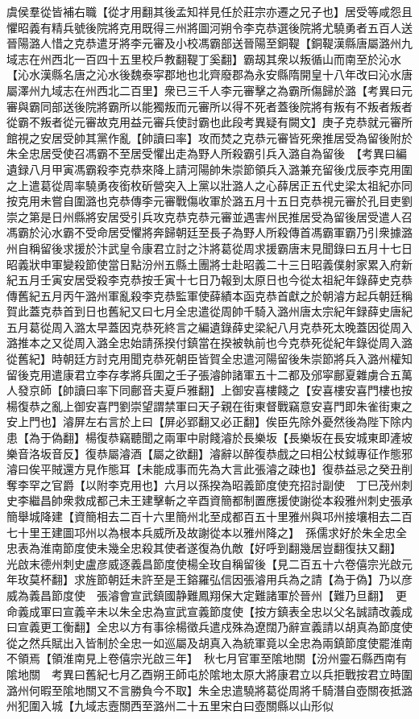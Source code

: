 虞侯羣從皆補右職【從才用翻其後孟知祥見任於莊宗亦遷之兄子也】居受等咸怨且懼昭義有精兵號後院將克用既得三州將圖河朔令李克恭選後院將尤驍勇者五百人送晉陽潞人惜之克恭遣牙將李元審及小校馮霸部送晉陽至銅鞮【銅鞮漢縣唐屬潞州九域志在州西北一百四十五里校戶教翻鞮丁奚翻】霸刼其衆以叛循山而南至於沁水【沁水漢縣名唐之沁水後魏泰寜郡地也北齊廢郡為永安縣隋開皇十八年改曰沁水唐屬澤州九域志在州西北二百里】衆已三千人李元審擊之為霸所傷歸於潞【考異曰元審與霸同部送後院將霸所以能獨叛而元審所以得不死者蓋後院將有叛有不叛者叛者從霸不叛者從元審故克用益元審兵使討霸也此段考異疑有闕文】庚子克恭就元審所館視之安居受帥其黨作亂【帥讀曰率】攻而焚之克恭元審皆死衆推居受為留後附於朱全忠居受使召馮霸不至居受懼出走為野人所殺霸引兵入潞自為留後　【考異曰編遺録八月甲寅馮霸殺李克恭來降上請河陽帥朱崇節領兵入潞兼充留後戊辰李克用圍之上遣葛從周率驍勇夜銜枚斫營突入上黨以壯潞人之心薛居正五代史梁太祖紀亦同按克用未嘗自圍潞也克恭傳李元審戰傷收軍於潞五月十五日克恭視元審於孔目吏劉崇之第是日州縣將安居受引兵攻克恭克恭元審並遇害州民推居受為留後居受遣人召馮霸於沁水霸不受命居受懼將奔歸朝廷至長子為野人所殺傳首馮霸軍霸乃引衆據潞州自稱留後求援於汴武皇令康君立討之汴將葛從周求援霸唐末見聞錄曰五月十七日昭義狀申軍變殺節使當日點汾州五縣土團將士赴昭義二十三日昭義僕射家累入府新紀五月壬寅安居受殺李克恭按壬寅十七日乃報到太原日也今從太祖紀年錄薛史克恭傳舊紀五月丙午潞州軍亂殺李克恭監軍使薛績本函克恭首獻之於朝濬方起兵朝廷稱賀此蓋克恭首到日也舊紀又曰七月全忠遣從周帥千騎入潞州唐太宗紀年録薛史唐紀五月葛從周入潞太早蓋因克恭死終言之編遺錄薛史梁紀八月克恭死太晚蓋因從周入潞推本之又從周入潞全忠始請孫揆付鎮當在揆被執前也今克恭死從紀年錄從周入潞從舊紀】時朝廷方討克用聞克恭死朝臣皆賀全忠遣河陽留後朱崇節將兵入潞州權知留後克用遣康君立李存孝將兵圍之壬子張濬帥諸軍五十二都及邠寜鄜夏雜虜合五萬人發京師【帥讀曰率下同鄜音夫夏戶雅翻】上御安喜樓餞之【安喜樓安喜門樓也按楊復恭之亂上御安喜門劉崇望謂禁軍曰天子親在街東督戰竊意安喜門即朱雀街東之安上門也】濬屏左右言於上曰【屏必郢翻又必正翻】俟臣先除外憂然後為陛下除内患【為于偽翻】楊復恭竊聽聞之兩軍中尉餞濬於長樂坂【長樂坂在長安城東即滻坡樂音洛坂音反】復恭屬濬酒【屬之欲翻】濬辭以醉復恭戲之曰相公杖鉞專征作態邪濬曰俟平賊還方見作態耳【未能成事而先為大言此張濬之疎也】復恭益忌之癸丑削奪李罕之官爵【以附李克用也】六月以孫揆為昭義節度使充招討副使　丁巳茂州刺史李繼昌帥衆救成都己未王建擊斬之辛酉資簡都制置應援使謝從本殺雅州刺史張承簡舉城降建【資簡相去二百十六里簡州北至成都百五十里雅州與邛州接壤相去二百七十里王建圖邛州以為根本兵威所及故謝從本以雅州降之】　孫儒求好於朱全忠全忠表為淮南節度使未幾全忠殺其使者遂復為仇敵【好呼到翻幾居豈翻復扶又翻】　光啟末德州刺史盧彦威逐義昌節度使楊全玫自稱留後【見二百五十六卷僖宗光啟元年玫莫杯翻】求旌節朝廷未許至是王鎔羅弘信因張濬用兵為之請【為于偽】乃以彦威為義昌節度使　張濬會宣武鎮國静難鳳翔保大定難諸軍於晉州【難乃旦翻】　更命義成軍曰宣義辛未以朱全忠為宣武宣義節度使【按方鎮表全忠以父名誠請改義成曰宣義更工衡翻】全忠以方有事徐楊徵兵遣戍殊為遼闊乃辭宣義請以胡真為節度使從之然兵賦出入皆制於全忠一如巡屬及胡真入為統軍竟以全忠為兩鎮節度使罷淮南不領焉【領淮南見上卷僖宗光啟三年】　秋七月官軍至隂地關【汾州靈石縣西南有隂地關　考異曰舊紀七月乙酉朔王師屯於隂地太原大將康君立以兵拒戰按君立時圍潞州何暇至隂地關又不言勝負今不取】朱全忠遣驍將葛從周將千騎潛自壺關夜抵潞州犯圍入城【九域志壼關西至潞州二十五里宋白曰壺關縣以山形似